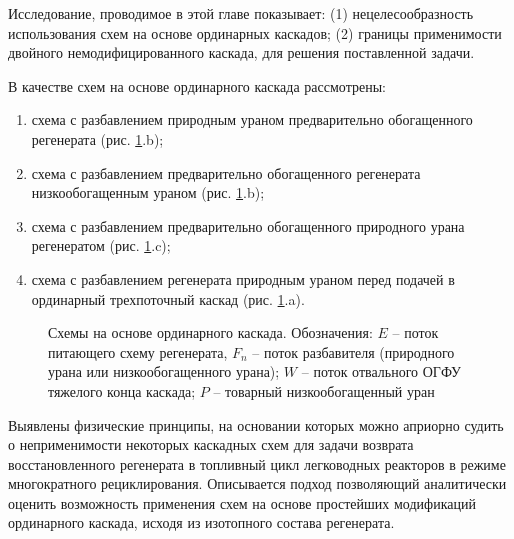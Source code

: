 Исследование, проводимое в этой главе показывает: (1) нецелесообразность использования схем на основе ординарных каскадов; (2) границы применимости двойного немодифицированного каскада, для решения поставленной задачи.

В качестве схем на основе ординарного каскада рассмотрены:

\begin{enumerate}
  \item схема с разбавлением природным ураном предварительно обогащенного регенерата (рис. \ref{fig:diagram1ch3}.b);
  \item схема с разбавлением предварительно обогащенного регенерата низкообогащенным ураном (рис. \ref{fig:diagram1ch3}.b);
  \item схема с разбавлением предварительно обогащенного природного урана регенератом (рис. \ref{fig:diagram1ch3}.c);
  \item схема с разбавлением регенерата природным ураном перед подачей в ординарный трехпоточный каскад (рис. \ref{fig:diagram1ch3}.a).
\end{enumerate}

\begin{figure}[ht]
  \caption{Схемы на основе ординарного каскада. Обозначения: $E$ -- поток питающего схему регенерата, $F_n$ -- поток разбавителя (природного урана или низкообогащенного урана); $W$ -- поток отвального ОГФУ тяжелого конца каскада; $P$ -- товарный низкообогащенный уран}\label{fig:diagram1ch3}
\end{figure}

Выявлены физические принципы, на основании которых можно априорно судить о неприменимости некоторых каскадных схем для задачи возврата восстановленного регенерата в топливный цикл легководных реакторов в режиме многократного рециклирования. Описывается подход позволяющий аналитически оценить возможность применения схем на основе простейших модификаций ординарного каскада, ис­ходя из изотопного состава регенерата.

